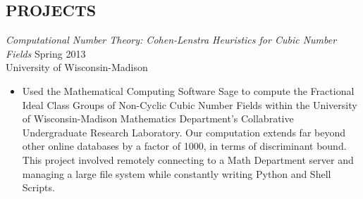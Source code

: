 \documentclass[margin]{res}
\begin{document}
\begin{resume}
 \section{PROJECTS} {\sl Computational Number Theory: Cohen-Lenstra Heuristics for Cubic Number Fields} \hfill Spring 2013 \\
 University of Wisconsin-Madison
 \begin{itemize}  \itemsep -2pt %
  \item Used the Mathematical Computing Software Sage to compute the
        Fractional Ideal Class Groups of Non-Cyclic Cubic Number Fields within the University of Wisconsin-Madison Mathematics Department's Collabrative Undergraduate Research Laboratory. Our computation extends far beyond other online databases by a factor of 1000, in terms of discriminant bound. This project involved remotely connecting to a Math Department server and managing a large file system while constantly writing Python and Shell Scripts.
 \end{itemize}



\end{resume}
\end{document}
